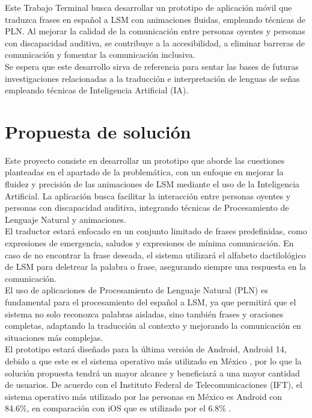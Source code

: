 Este Trabajo Terminal busca desarrollar un prototipo de aplicación móvil que traduzca frases en español a LSM con animaciones fluidas, empleando técnicas de PLN. Al mejorar la calidad de la comunicación entre personas oyentes y personas con discapacidad auditiva, se contribuye a la accesibilidad, a eliminar barreras de comunicación y fomentar la comunicación inclusiva.\\

Se espera que este desarrollo sirva de referencia para sentar las bases de futuras investigaciones relacionadas a la traducción e interpretación de lenguas de señas empleando técnicas de Inteligencia Artificial (IA).\\

\section{Propuesta de solución}
Este proyecto consiste en desarrollar un prototipo que aborde las cuestiones planteadas en el apartado de la problemática, con un enfoque en mejorar la fluidez y precisión de las animaciones de LSM mediante el uso de la Inteligencia Artificial. La aplicación busca facilitar la interacción entre personas oyentes y personas con discapacidad auditiva, integrando técnicas de Procesamiento de Lenguaje Natural y animaciones.\\

El traductor estará enfocado en un conjunto limitado de frases predefinidas, como expresiones de emergencia, saludos y expresiones de mínima comunicación. En caso de no encontrar la frase deseada, el sistema utilizará el alfabeto dactilológico de LSM para deletrear la palabra o frase, asegurando siempre una respuesta en la comunicación.\\

El uso de aplicaciones de Procesamiento de Lenguaje Natural (PLN) es fundamental para el procesamiento del español a LSM, ya que permitirá que el sistema no solo reconozca palabras aisladas, sino también frases y oraciones completas, adaptando la traducción al contexto y mejorando la comunicación en situaciones más complejas.\\

\newpage
El prototipo estará diseñado para la última versión de Android, Android 14, debido a que este es el sistema operativo más utilizado en México \cite{ref5}, por lo que la solución propuesta tendrá un mayor alcance y beneficiará a una mayor cantidad de usuarios. De acuerdo con el Instituto Federal de Telecomunicaciones (IFT), el sistema operativo más utilizado por las personas en México es Android con 84.6\%, en comparación con iOS que es utilizado por el 6.8\% \cite{ref6}.\\


